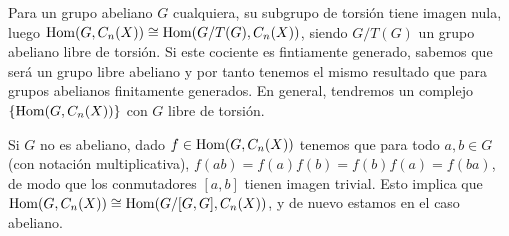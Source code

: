 \documentclass[twoside]{article}
\begin{document}
\begin{solucion}
Para un grupo abeliano $G$ cualquiera, su subgrupo de torsión tiene imagen nula, luego $\operatorname{Hom}(G,C_n(X))\cong \operatorname{Hom}(G/T(G),C_n(X))$, siendo $G/T(G)$ un grupo abeliano libre de torsión. Si este cociente es fintiamente generado, sabemos que será un grupo libre abeliano y por tanto tenemos el mismo resultado que para grupos abelianos finitamente generados. En general, tendremos un complejo $\{\operatorname{Hom}(G,C_n(X))\}$ con $G$ libre de torsión.

Si $G$ no es abeliano, dado $f\in\operatorname{Hom}(G,C_n(X))$ tenemos que para todo $a,b\in G$ (con notación multiplicativa), $f(ab)=f(a)f(b)=f(b)f(a)=f(ba)$, de modo que los conmutadores $[a,b]$ tienen imagen trivial. Esto implica que $\operatorname{Hom}(G,C_n(X))\cong\operatorname{Hom}(G/[G,G],C_n(X))$, y de nuevo estamos en el caso abeliano. 



\end{solucion}
\end{document}
